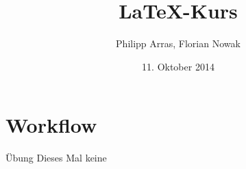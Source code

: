 \documentclass[11pt]{beamer}
\author{Philipp Arras, Florian Nowak}
\title{\LaTeX -Kurs}
\date{11. Oktober 2014}
\begin{document}


\section{Workflow}
\begin{frame}{Übung}
Dieses Mal keine {\smiley}
\end{frame}
\end{document}
